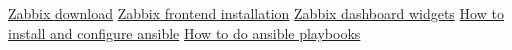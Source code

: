 \begin{thebibliography}{0}
    
    \bibitem{} \href{https://www.zabbix.com/download?}{Zabbix download}
    \bibitem{} \href{https://www.zabbix.com/documentation/5.0/manual/installation/frontend}{Zabbix frontend installation}
    \bibitem{} \href{https://www.zabbix.com/documentation/5.4/en/manual/web_interface/frontend_sections/monitoring/dashboard/widgets}{Zabbix dashboard widgets}
    \bibitem{} \href{https://www.digitalocean.com/community/tutorials/how-to-install-and-configure-ansible-on-ubuntu-20-04-es}{How to install and configure ansible}
    \bibitem{} \href{https://www.youtube.com/watch?v=Wuv0ZPOMLf0}{How to do ansible playbooks}
\end{thebibliography}


